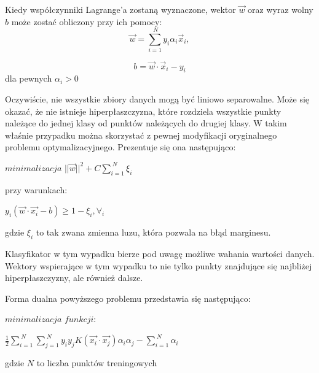 \documentclass[[10pt,a4paper]{article}
\begin{document}
Kiedy współczynniki Lagrange'a zostaną wyznaczone, wektor $\overrightarrow{w}$ oraz wyraz wolny $b$ może zostać obliczony przy ich pomocy:
\begin{equation}
\overrightarrow{w} = \sum_{i=1}^{\ N} y_i \alpha_i \overrightarrow{x}_i,  
\end{equation}

\begin{equation}
b = \overrightarrow{w} \cdot \overrightarrow{x}_i - y_i  
\end{equation}
dla pewnych  $\alpha_i > 0 $

\vspace{5mm}Oczywiście, nie wszystkie zbiory danych mogą być liniowo separowalne. Może się okazać, że nie istnieje hiperpłaszczyzna, które rozdziela wszystkie punkty należące do jednej klasy od punktów należących do drugiej klasy. W takim właśnie przypadku można skorzystać z pewnej modyfikacji oryginalnego problemu optymalizacyjnego. Prezentuje się ona następująco: 

\vspace{5mm}\centerline {$minimalizacja$  $||\overrightarrow{w}||^2+ C \sum_{i=1}^{\ N} \xi_i$}

\vspace{5mm} przy warunkach:

\vspace{5mm}\centerline {$y_i(\overrightarrow{w} \cdot \overrightarrow{x_i} - b)\geq 1 - \xi_i, \forall_i$}

\vspace{5mm}gdzie $\xi_i$ to tak zwana zmienna luzu, która pozwala na błąd marginesu. 

\vspace{5mm} Klasyfikator w tym wypadku bierze pod uwagę możliwe wahania wartości danych. Wektory wspierające w tym wypadku to nie tylko punkty znajdujące się najbliżej hiperpłaszczyzny, ale również dalsze. 

\vspace{5mm}Forma dualna powyższego problemu przedstawia się następująco:

\vspace{5mm}\centerline {$minimalizacja$  $funkcji:$}

\vspace{5mm}\centerline {$\frac{1}{2} \sum_{i=1}^{\ N} \sum_{j=1}^{\ N} y_i y_j  K(\overrightarrow{x_i} \cdot\overrightarrow{x_j}) \alpha_i \alpha_j - \sum_{i=1}^{\ N} \alpha_i$}
  
\vspace{5mm} gdzie $N$ to liczba punktów treningowych
\end{document}
